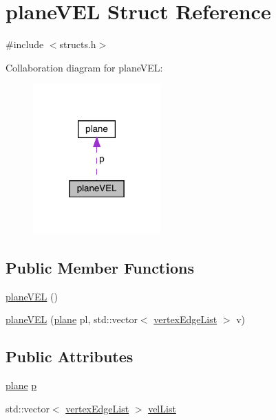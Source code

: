 \hypertarget{structplane_v_e_l}{}\section{plane\+V\+EL Struct Reference}
\label{structplane_v_e_l}


{\ttfamily \#include $<$structs.\+h$>$}



Collaboration diagram for plane\+V\+EL\+:
\nopagebreak
\begin{figure}[H]
\begin{center}
\leavevmode
\includegraphics[width=139pt]{structplane_v_e_l__coll__graph}
\end{center}
\end{figure}
\subsection*{Public Member Functions}
\begin{DoxyCompactItemize}
\item 
\mbox{\hyperlink{structplane_v_e_l_a23bf21cc557fa38db7a07cf77a22973d}{plane\+V\+EL}} ()
\item 
\mbox{\hyperlink{structplane_v_e_l_a6213d9d6eb1591469b48157ee1c0110b}{plane\+V\+EL}} (\mbox{\hyperlink{structplane}{plane}} pl, std\+::vector$<$ \mbox{\hyperlink{structvertex_edge_list}{vertex\+Edge\+List}} $>$ v)
\end{DoxyCompactItemize}
\subsection*{Public Attributes}
\begin{DoxyCompactItemize}
\item 
\mbox{\hyperlink{structplane}{plane}} \mbox{\hyperlink{structplane_v_e_l_a8ea259111525aaae0eb47c16ee2b1294}{p}}
\item 
std\+::vector$<$ \mbox{\hyperlink{structvertex_edge_list}{vertex\+Edge\+List}} $>$ \mbox{\hyperlink{structplane_v_e_l_af46afbe3061e68d08132aec85b94deb8}{vel\+List}}
\end{DoxyCompactItemize}


